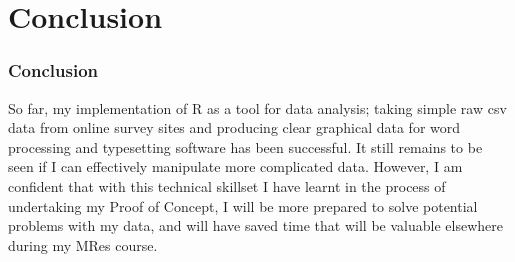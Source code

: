 \documentclass{beamer}
\begin{document}
\section{Conclusion}
\begin{frame}
\frametitle{Conclusion}
So far, my implementation of R as a tool for data analysis; taking simple raw csv data from online survey sites and producing clear graphical data for word processing and typesetting software has been successful. It still remains to be seen if I can effectively manipulate more complicated data. However, I am confident that with this technical skillset I have learnt in the process of undertaking my Proof of Concept, I will be more prepared to solve potential problems with my data, and will have saved time that will be valuable elsewhere during my MRes course.
\end{frame}

\end{document}
